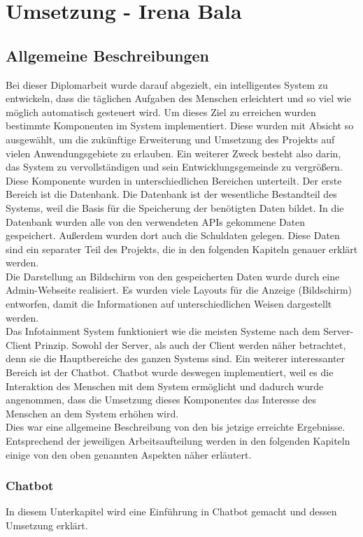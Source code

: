 \chapter{Umsetzung - Irena Bala}
\section{Allgemeine Beschreibungen}
Bei dieser Diplomarbeit wurde darauf abgezielt, ein intelligentes System zu entwickeln, dass die täglichen Aufgaben des Menschen erleichtert und so viel wie möglich automatisch gesteuert wird. Um dieses Ziel zu erreichen wurden bestimmte Komponenten im System implementiert. Diese wurden mit Absicht so ausgewählt, um die zukünftige Erweiterung und Umsetzung des Projekts auf vielen Anwendungsgebiete zu erlauben.  Ein weiterer Zweck besteht also darin, das System zu vervollständigen und sein Entwicklungsgemeinde zu vergrößern. \\
Diese Komponente wurden in unterschiedlichen Bereichen unterteilt. Der erste Bereich ist die Datenbank. Die Datenbank ist der wesentliche Bestandteil des Systems, weil die Basis für die Speicherung der benötigten Daten bildet. In die Datenbank wurden alle von den verwendeten APIs gekommene Daten gespeichert. Außerdem wurden dort auch die Schuldaten gelegen. Diese Daten sind ein separater Teil des Projekts, die in den folgenden Kapiteln genauer erklärt werden. \\
Die Darstellung an Bildschirm von den gespeicherten Daten wurde durch eine Admin-Webseite realisiert. Es wurden viele Layouts für die Anzeige (Bildschirm) entworfen, damit die Informationen auf unterschiedlichen Weisen dargestellt werden. \\
Das Infotainment System funktioniert wie die meisten Systeme nach dem Server- Client Prinzip. Sowohl der Server, als auch der Client werden näher betrachtet, denn sie die Hauptbereiche des ganzen Systems sind. 
Ein weiterer interessanter Bereich ist der Chatbot. Chatbot wurde deswegen implementiert, weil es die Interaktion des Menschen mit dem System ermöglicht und dadurch wurde angenommen, dass die Umsetzung dieses Komponentes das Interesse des Menschen an dem System erhöhen wird. \\
Dies war eine allgemeine Beschreibung von den bis jetzige erreichte Ergebnisse. Entsprechend der jeweiligen Arbeitsaufteilung werden in den folgenden Kapiteln einige von den oben genannten Aspekten näher erläutert. \\
\subsection{Chatbot} 
In diesem Unterkapitel wird eine Einführung in Chatbot gemacht und dessen Umsetzung erklärt.

